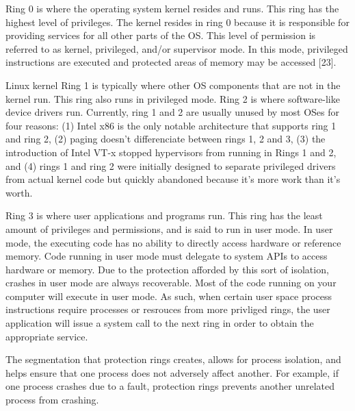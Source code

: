 \documentclass{report}
\begin{document}
\begin{spacing}{1.5}
{\large
Ring 0 is where the operating system kernel resides and runs. This ring has the highest level of privileges. The kernel resides in ring 0 because it is responsible for providing services for all other parts of the OS. This level of permission is referred to as kernel, privileged, and/or supervisor mode. In this mode, privileged instructions are executed and protected areas of memory may be accessed [23].

Linux kernel Ring 1 is typically where other OS components that are not in the kernel run. This ring also runs in privileged mode. Ring 2 is where software-like device drivers run. Currently, ring 1 and 2 are usually unused by most OSes for four reasons: (1) Intel x86 is the only notable architecture that supports ring 1 and ring 2, (2) paging doesn't differenciate between rings 1, 2 and 3, (3) the introduction of Intel VT-x stopped hypervisors from running in Rings 1 and 2, and (4) rings 1 and ring 2 were initially designed to separate privileged drivers from actual kernel code but quickly abandoned because it's more work than it's worth. 

Ring 3 is where user applications and programs run. This ring has the least amount of privileges and permissions, and is said to run in user mode. In user mode, the executing code has no ability to directly access hardware or reference memory. Code running in user mode must delegate to system APIs to access hardware or memory. Due to the protection afforded by this sort of isolation, crashes in user mode are always recoverable. Most of the code running on your computer will execute in user mode. As such, when certain user space process instructions require processes or resrouces from more privliged rings, the user application will issue a system call to the next ring in order to obtain the appropriate service.
\newline
}

{\large
The segmentation that protection rings creates, allows for process isolation, and helps ensure that one process does not adversely affect another. For example, if one process crashes due to a fault, protection rings prevents another unrelated process from crashing.
}
\newpage

















\end{spacing}
\end{document}
